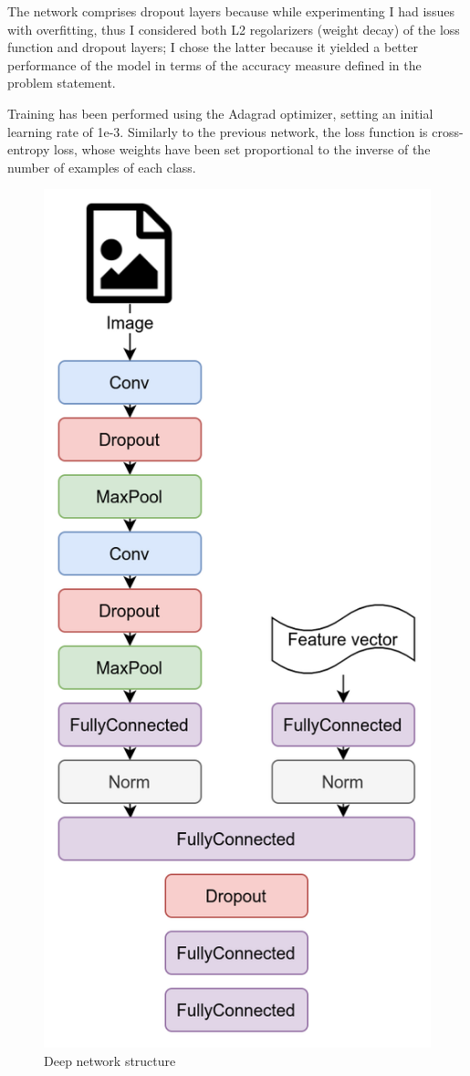 \documentclass[10pt,a4paper,twocolumn]{article}
\begin{document}
The network comprises dropout layers because while experimenting I had issues with overfitting, thus I considered both L2 regolarizers (weight decay) of the loss function and dropout layers; I chose the latter because it yielded a better performance of the model in terms of the accuracy measure defined in the problem statement.

Training has been performed using the Adagrad optimizer, setting an initial learning rate of 1e-3. Similarly to the previous network, the loss function is cross-entropy loss, whose weights have been set proportional to the inverse of the number of examples of each class.

\begin{figure}[H]
    \includegraphics[width=0.7\linewidth]{Network.png}
    \caption{Deep network structure}
    \label{fig:1}
\end{figure}
\end{document}
